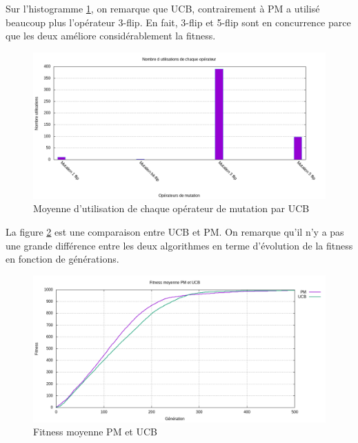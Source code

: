 \documentclass[12pt]{article}
\begin{document}
Sur l'histogramme \ref{histogrammeOpucb}, on remarque que UCB, contrairement à PM a utilisé beaucoup plus l'opérateur 3-flip. En fait, 3-flip et 5-flip sont en concurrence parce que les deux améliore considérablement la fitness.  

\begin{figure}[H]
	\begin{center}
		\includegraphics[scale=0.5]{img/histogrammeOpucb.png}
		\caption{Moyenne d'utilisation de chaque opérateur de mutation par UCB}
		\label{histogrammeOpucb}
	\end{center}
\end{figure}

La figure \ref{curve_fitness_ucb_pm} est une comparaison entre UCB et PM. On remarque qu'il n'y a pas une grande différence entre les deux algorithmes en terme d'évolution de la fitness en fonction de générations.

\begin{figure}[H]
	\begin{center}
		\includegraphics[scale=0.5]{img/curve_fitness_ucb_pm.png}
		\caption{Fitness moyenne PM et UCB}
		\label{curve_fitness_ucb_pm}
	\end{center}
\end{figure}
\end{document}
